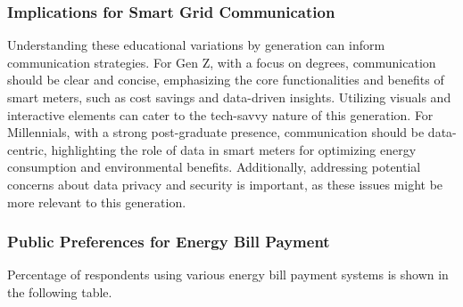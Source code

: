 \documentclass[
  letterpaper,
  DIV=11,
  numbers=noendperiod]{scrartcl}
\begin{document}
\subsubsection{Implications for Smart Grid
Communication}\label{implications-for-smart-grid-communication}

Understanding these educational variations by generation can inform
communication strategies. For Gen Z, with a focus on degrees,
communication should be clear and concise, emphasizing the core
functionalities and benefits of smart meters, such as cost savings and
data-driven insights. Utilizing visuals and interactive elements can
cater to the tech-savvy nature of this generation. For Millennials, with
a strong post-graduate presence, communication should be data-centric,
highlighting the role of data in smart meters for optimizing energy
consumption and environmental benefits. Additionally, addressing
potential concerns about data privacy and security is important, as
these issues might be more relevant to this generation.

\subsubsection{Public Preferences for Energy Bill
Payment}\label{public-preferences-for-energy-bill-payment}

Percentage of respondents using various energy bill payment systems is
shown in the following table.
\end{document}
